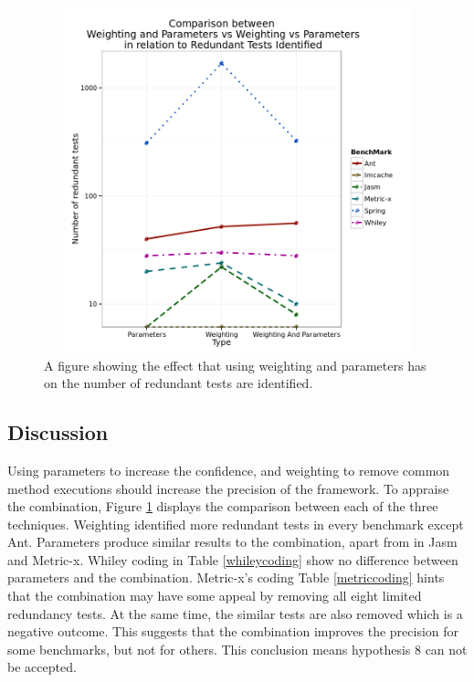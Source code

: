 \begin{figure}[h]
\begin{center}
\includegraphics[height=10cm, width = 14.5cm]{WeightNParamVAll.png}
\end{center}
\caption{A figure showing the effect that using weighting and parameters has on the number of redundant tests are identified.}
\label{fig:weightingparamgraph}
\end{figure}

\subsection{Discussion}
Using parameters to increase the confidence, and weighting to remove common method executions should increase the precision of the framework. To appraise the combination, Figure \ref{fig:weightingparamgraph} displays the comparison between each of the three techniques. Weighting identified more redundant tests in every benchmark except Ant. Parameters produce similar results to the combination, apart from in Jasm and Metric-x. Whiley coding in Table \ref{whileycoding} show no difference between parameters and the combination. Metric-x's coding Table \ref{metriccoding} hints that the combination may have some appeal by removing all eight limited redundancy tests. At the same time, the similar tests are also removed which is a negative outcome. This suggests that the combination improves the precision for some benchmarks, but not for others. This conclusion means hypothesis 8 can not be accepted. 


